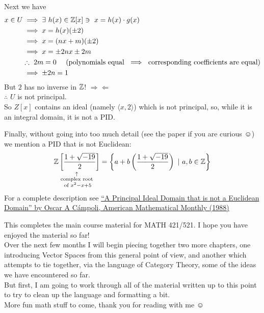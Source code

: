 Next we have 
\begin{align*}
    x\in U &\implies \exists \ h(x) \in {\mathbb{ Z}}[x]\ni \ x=h(x)\cdot g(x) \\
    &\implies x=h(x)(\pm 2) \\
    &\implies x=(nx+m)(\pm 2) \\
    &\implies x=\pm 2nx \pm 2m \\ 
    & \therefore  \ 2m =0 \ \ \ \ (\text{polynomials equal } \implies \text{ corresponding coefficients are equal})\\
    &\implies \pm 2n =1
\end{align*}
But $2$ has no inverse in ${\mathbb{ Z}}$! $\Rightarrow\Leftarrow$ \\ 
$\therefore$ $U$ is not principal. \\

So $Z[x]$ contains an ideal (namely $\langle x,2 \rangle$) which is not principal, so, while it is an integral domain, it is not a PID.

Finally, without going into too much detail (see the paper if you are curious $\smiley$) we mention a PID that is not Euclidean:
\begin{align*}
    \underset{\substack{ \uparrow \\ \text{complex root} \\ \text{ of } x^2-x+5}}{{\mathbb{ Z}} \left[ \frac{1+\sqrt{-19}}{2} \right] } = \left\{ a+b \left( \frac{1+\sqrt{-19}}{2} \right) \ | \ a,b \in {\mathbb{ Z}} \right\}
\end{align*}
For a complete description see \href{https://www.stat.uchicago.edu/~lekheng/courses/114s09/pidnoted.pdf}{``A Principal Ideal Domain that is not a Euclidean Domain'' by Oscar A C\'{a}mpoli, American Mathematical Monthly (1988)}


\begin{tcolorbox}
    This completes the main course material for MATH 421/521. I hope you have enjoyed the material so far! \\ 
    
    Over the next few months I will begin piecing together two more chapters, one introducing Vector Spaces from this general point of view, and another which attempts to tie together, via the language of Category Theory, some of the ideas we have encountered so far. \\

    But first, I am going to work through all of the material written up to this point to try to clean up the language and formatting a bit. \\

    More fun math stuff to come, thank you for reading with me $\smiley$
\end{tcolorbox}

